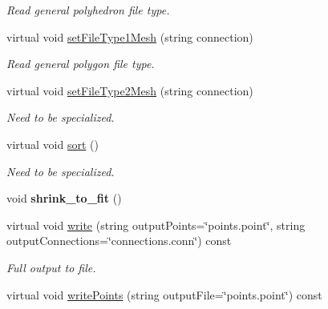 \begin{DoxyCompactItemize}
\begin{DoxyCompactList}\small\item\em Read general polyhedron file type. \end{DoxyCompactList}\item 
virtual void \hyperlink{class_mesh_a349da9279777b5cae335524136f85567}{set\+File\+Type1\+Mesh} (string connection)\hypertarget{class_mesh_a349da9279777b5cae335524136f85567}{}\label{class_mesh_a349da9279777b5cae335524136f85567}

\begin{DoxyCompactList}\small\item\em Read general polygon file type. \end{DoxyCompactList}\item 
virtual void \hyperlink{class_mesh_a03cb81990255eea926696f883279935e}{set\+File\+Type2\+Mesh} (string connection)\hypertarget{class_mesh_a03cb81990255eea926696f883279935e}{}\label{class_mesh_a03cb81990255eea926696f883279935e}

\begin{DoxyCompactList}\small\item\em Need to be specialized. \end{DoxyCompactList}\item 
virtual void \hyperlink{class_mesh_a5cb1110ec8bf2b1d089453f873df226f}{sort} ()
\begin{DoxyCompactList}\small\item\em Need to be specialized. \end{DoxyCompactList}\item 
void {\bfseries shrink\+\_\+to\+\_\+fit} ()\hypertarget{class_mesh_a9c9daf07927688c3a156ee1ef0c95900}{}\label{class_mesh_a9c9daf07927688c3a156ee1ef0c95900}

\item 
virtual void \hyperlink{class_mesh_acf271beef22b8df2fb50cd9f14da7c6a}{write} (string output\+Points=\char`\"{}points.\+point\char`\"{}, string output\+Connections=\char`\"{}connections.\+conn\char`\"{}) const \hypertarget{class_mesh_acf271beef22b8df2fb50cd9f14da7c6a}{}\label{class_mesh_acf271beef22b8df2fb50cd9f14da7c6a}

\begin{DoxyCompactList}\small\item\em Full output to file. \end{DoxyCompactList}\item 
virtual void \hyperlink{class_mesh_a1ff4e8213296a357a0df5b7051008ae3}{write\+Points} (string output\+File=\char`\"{}points.\+point\char`\"{}) const \hypertarget{class_mesh_a1ff4e8213296a357a0df5b7051008ae3}{}\label{class_mesh_a1ff4e8213296a357a0df5b7051008ae3}


\end{DoxyCompactItemize}
